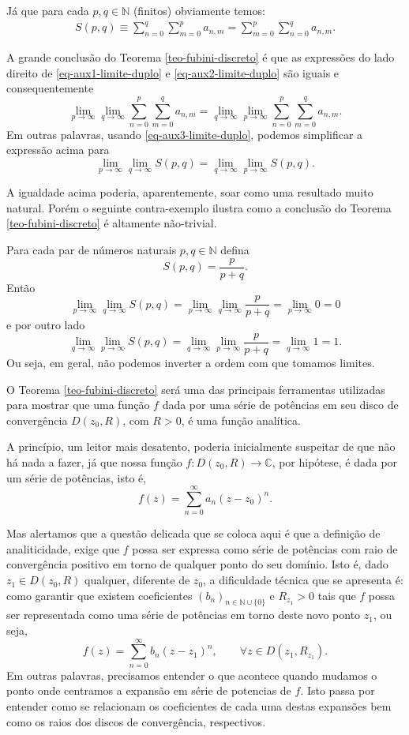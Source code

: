 Já que para cada $p,q\in\mathbb{N}$ (finitos) obviamente temos:
\begin{align}
\label{eq-aux3-limite-duplo}
S(p,q) 
\equiv 
\sum_{n=0}^{q} \sum_{m=0}^{p}a_{n,m} 
= 
\sum_{m=0}^{p}\sum_{n=0}^{q} a_{n,m}. 
\end{align}

A grande conclusão do Teorema \ref{teo-fubini-discreto} é que
as expressões do lado direito de \eqref{eq-aux1-limite-duplo}
e \eqref{eq-aux2-limite-duplo} são iguais e consequentemente 
\[
\lim_{p\to\infty} \lim_{q\to\infty} \sum_{n=0}^{p} \sum_{m=0}^{q}a_{n,m}
=
\lim_{q\to\infty}\lim_{p\to\infty} \sum_{n=0}^{p} \sum_{m=0}^{q}a_{n,m}.
\]
Em outras palavras, usando \eqref{eq-aux3-limite-duplo}, podemos simplificar
a expressão acima para
\[
\lim_{p\to\infty} \lim_{q\to\infty} S(p,q)
=
\lim_{q\to\infty}\lim_{p\to\infty} S(p,q).
\]

A igualdade acima poderia, aparentemente, soar como uma resultado muito natural. 
Porém o seguinte contra-exemplo ilustra como a conclusão do Teorema
\ref{teo-fubini-discreto} é altamente não-trivial.

\begin{exemplo}
Para cada par de números naturais $p,q\in\mathbb{N}$ defina 
\[
S(p,q) =  \frac{p}{p+q}.
\]
Então 
\[
\lim_{p\to\infty} \lim_{q\to\infty} S(p,q)
= 
\lim_{p\to\infty} \lim_{q\to\infty} \frac{p}{p+q}
= 
\lim_{p\to\infty} 0
=0
\]
e por outro lado 
\[
\lim_{q\to\infty}\lim_{p\to\infty} S(p,q)
=
\lim_{q\to\infty} \lim_{p\to\infty} \frac{p}{p+q}
=
\lim_{q\to\infty} 1
=1.
\]
Ou seja, em geral, não podemos inverter a ordem com que tomamos
limites.
\end{exemplo}


O Teorema \ref{teo-fubini-discreto} será uma das principais ferramentas utilizadas 
para mostrar que uma função $f$ dada por uma série
de potências em seu disco de convergência $D(z_0,R)$, com $R>0$,  
é uma função analítica.

A princípio, um leitor mais desatento, poderia inicialmente suspeitar de 
que não há nada a fazer, já que nossa função 
$f:D(z_0,R)\to\mathbb{C}$, por hipótese, é dada
por um série de potências, isto é,
\[
f(z) = \sum_{n=0}^{\infty}a_n(z-z_0)^n. 
\]

Mas alertamos que a questão delicada que se coloca aqui 
é que a definição de analiticidade,
exige que $f$ possa ser expressa como série de potências com raio 
de convergência positivo em torno de qualquer ponto do seu domínio. 
Isto é, dado
$z_1\in D(z_0,R)$ qualquer, diferente de $z_0$, a dificuldade técnica que 
se apresenta é: como garantir
que existem coeficientes $(b_n)_{n\in\mathbb{N}\cup\{0\}}$ 
e $R_{z_1}>0$ tais que $f$ possa ser representada como uma 
série de potências em torno deste novo ponto $z_1$, ou seja,
\[
f(z) = \sum_{n=0}^{\infty} b_n(z-z_1)^n, \qquad \forall z\in D(z_1,R_{z_1}).
\]
Em outras palavras, precisamos entender o que acontece quando mudamos
o ponto onde centramos a expansão em série de potencias de $f$. 
Isto passa por entender como se relacionam os coeficientes de cada 
uma destas expansões bem como os raios dos discos de convergência,
respectivos. 


